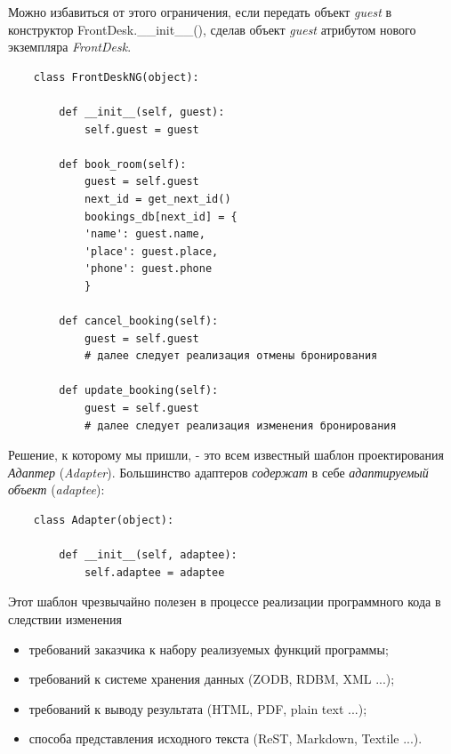 \documentclass[a4paper,openany,twoside,draft]{book}
\providecommand*{\DUroletitlereference}[1]{\textsl{#1}}
\begin{document}
Можно избавиться от этого ограничения, если передать объект \DUroletitlereference{guest} в
конструктор FrontDesk.\_\_init\_\_(), сделав объект \DUroletitlereference{guest} атрибутом
нового экземпляра \DUroletitlereference{FrontDesk}.

\begin{verbatim}
    class FrontDeskNG(object):

        def __init__(self, guest):
            self.guest = guest

        def book_room(self):
            guest = self.guest
            next_id = get_next_id()
            bookings_db[next_id] = {
            'name': guest.name,
            'place': guest.place,
            'phone': guest.phone
            }

        def cancel_booking(self):
            guest = self.guest
            # далее следует реализация отмены бронирования

        def update_booking(self):
            guest = self.guest
            # далее следует реализация изменения бронирования
\end{verbatim}

Решение, к которому мы пришли, - это всем известный шаблон
проектирования \emph{Адаптер} (\emph{Adapter}). Большинство адаптеров \emph{содержат}
в себе \emph{адаптируемый объект} (\emph{adaptee}):

\begin{verbatim}
    class Adapter(object):

        def __init__(self, adaptee):
            self.adaptee = adaptee
\end{verbatim}

Этот шаблон чрезвычайно полезен в процессе реализации программного
кода в следствии изменения

\begin{itemize}

\item требований заказчика к набору реализуемых функций программы;

\item требований к системе хранения данных (ZODB, RDBM, XML ...);

\item требований к выводу результата (HTML, PDF, plain text ...);

\item способа представления исходного текста (ReST, Markdown, Textile
...).

\end{itemize}
\end{document}
